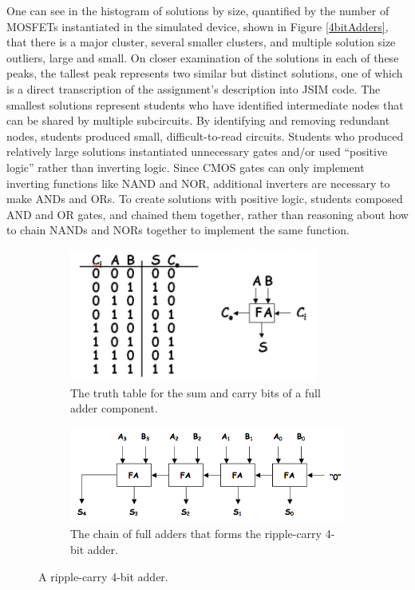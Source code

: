\documentclass[12pt]{article}
\begin{document}
One can see in the histogram of solutions by size, quantified by the number of MOSFETs instantiated in the simulated device, shown in Figure \ref{4bitAdders}, that there is a major cluster, several smaller clusters, and multiple solution size outliers, large and small. On closer examination of the solutions in each of these peaks, the tallest peak represents two similar but distinct solutions, one of which is a direct transcription of the assignment's description into JSIM code. The smallest solutions represent students who have identified intermediate nodes that can be shared by multiple subcircuits. By identifying and removing redundant nodes, students produced small, difficult-to-read circuits. Students who produced relatively large solutions instantiated unnecessary gates and/or used ``positive logic'' rather than inverting logic. Since CMOS gates can only implement inverting functions like NAND and NOR, additional inverters are necessary to make ANDs and ORs. To create solutions with positive logic, students composed AND and OR gates, and chained them together, rather than reasoning about how to chain NANDs and NORs together to implement the same function.


\begin{figure}
\begin{subfigure}{1.0\columnwidth}
\centering
\includegraphics[scale=0.45]{fullAdderAndTruthTable.png}
\caption{The truth table for the sum and carry bits of a full adder component.}
\label{fullAdderAndTruthTable}
\end{subfigure}
\begin{subfigure}{1.0\columnwidth}
	\centering
\includegraphics[scale=0.45]{chainedFullAdders.png}
\caption{The chain of full adders that forms the ripple-carry 4-bit adder.}
\label{chainedFullAdders}
\end{subfigure}
\caption{A ripple-carry 4-bit adder.}
\label{allFullAdders}
\end{figure}
\end{document}
